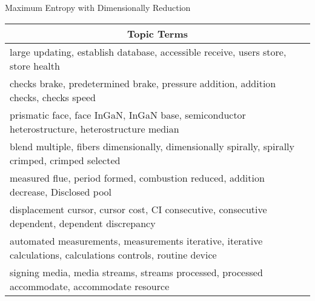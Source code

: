 

 
\begin{tablehere}
\begin{center}
\caption{Maximum Entropy with Dimensionally Reduction}
\begin{tabular}{| p{} |}
\hline

\multicolumn{1}{|c|}{\textbf{Topic Terms}} \\ \hline
large updating, establish database, accessible receive, users store, store health\\ \hline

checks brake, predetermined brake, pressure addition, addition checks, checks speed\\ \hline	

prismatic face, face InGaN, InGaN base, semiconductor heterostructure, heterostructure median\\ \hline

blend multiple, fibers dimensionally, dimensionally spirally, spirally crimped, crimped selected\\ \hline

measured flue, period formed, combustion reduced, addition decrease, Disclosed pool\\ \hline 

displacement cursor, cursor cost, CI consecutive, consecutive dependent, dependent discrepancy\\ \hline 

automated measurements, measurements iterative, iterative calculations, calculations controls, routine device\\ \hline

signing media, media streams, streams processed, processed accommodate, accommodate resource\\ \hline
\end{tabular}
\end{center}
\end{tablehere}


